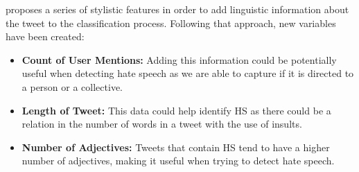 
\cite{fersini-2018} proposes a series of stylistic features in order to add linguistic information about the tweet to the classification process. Following that approach, new variables have been created:
\begin{itemize}
    \item \textbf{Count of User Mentions:} Adding this information could be potentially useful when detecting hate speech as we are able to capture if it is directed to a person or a collective.
    \item \textbf{Length of Tweet:} This data could help identify HS as there could be a relation in the number of words in a tweet with the use of insults.
    \item \textbf{Number of Adjectives:} Tweets that contain HS tend to have a higher number of adjectives, making it useful when trying to detect hate speech.
\end{itemize}

\newpage